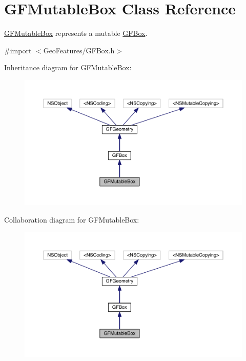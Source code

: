 \hypertarget{interface_g_f_mutable_box}{}\section{G\+F\+Mutable\+Box Class Reference}
\label{interface_g_f_mutable_box}


\hyperlink{interface_g_f_mutable_box}{G\+F\+Mutable\+Box} represents a mutable \hyperlink{interface_g_f_box}{G\+F\+Box}.  




{\ttfamily \#import $<$Geo\+Features/\+G\+F\+Box.\+h$>$}



Inheritance diagram for G\+F\+Mutable\+Box\+:\nopagebreak
\begin{figure}[H]
\begin{center}
\leavevmode
\includegraphics[width=350pt]{interface_g_f_mutable_box__inherit__graph}
\end{center}
\end{figure}


Collaboration diagram for G\+F\+Mutable\+Box\+:\nopagebreak
\begin{figure}[H]
\begin{center}
\leavevmode
\includegraphics[width=350pt]{interface_g_f_mutable_box__coll__graph}
\end{center}
\end{figure}
